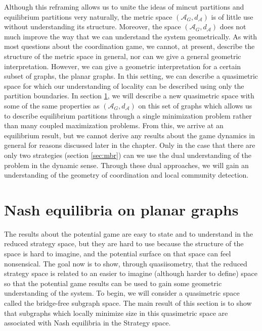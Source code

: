 \documentclass{article}
\begin{document}
    Although this reframing allows us to unite the ideas of mincut partitions and equilibrium partitions very naturally, the metric space $(\mathcal{A}_G,d_\mathcal{A})$ is of little use without understanding its structure. Moreover, the space $(\mathcal{A}_G,d_\mathcal{A})$ does not much improve the way that we can understand the system geometrically. As with most questions about the coordination game, we cannot, at present, describe the structure of the metric space in general, nor can we give a general geometric interpretation. However, we can give a geometric interpretation for a certain subset of graphs, the planar graphs. In this setting, we can describe a quasimetric space for which our understanding of locality can be described using only the partition boundaries. In section \ref{sec:nashequilibria}, we will describe a new quasimetric space with some of the same properties as $(\mathcal{A}_G,d_{\mathcal{A}})$ on this set of graphs which allows us to describe equilibrium partitions through a single minimization problem rather than many coupled maximization problems. From this, we arrive at an equilibrium result, but we cannot derive any results about the game dynamics in general for reasons discussed later in the chapter. Only in the case that there are only two strategies (section \ref{sec:mbr}) can we use the dual understanding of the problem in the dynamic sense. Through these dual approaches, we will gain an understanding of the geometry of coordination and local community detection. 




\section{Nash equilibria on planar graphs}\label{sec:nashequilibria}
The results about the potential game are easy to state and to understand in the reduced strategy space, but they are hard to use because the structure of the space is hard to imagine, and the potential surface on that space can feel nonsensical. The goal now is to show, through quasiisometry, that the reduced strategy space is related to an easier to imagine (although harder to define) space so that the potential game results can be used to gain some geometric understanding of the system. To begin, we will consider a quasimetric space called the bridge-free subgraph space. The main result of this section is to show that subgraphs which locally minimize size in this quasimetric space are associated with Nash equilibria in the Strategy space. 
\end{document}
